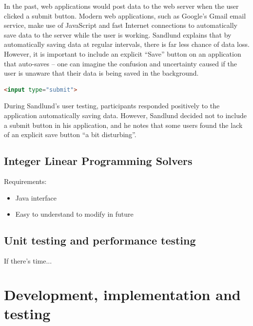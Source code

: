 \documentclass[draft]{scrartcl}
\begin{document}

In the past, web applications would \gls{post} data to the web server when the
user clicked a submit button. Modern web applications, such as Google's Gmail
email service, make use of JavaScript and fast Internet connections to
automatically save data to the server while the user is working. Sandlund
\cite{sandlund2009websoftware} explains that by automatically saving data at
regular intervals, there is far less chance of data loss. However, it is
important to include an explicit ``Save'' button on an application that
auto-saves -- one can imagine the confusion and uncertainty caused if the user
is unaware that their data is being saved in the background.

\begin{lstlisting}[language=HTML]
<input type="submit">
\end{lstlisting}

During Sandlund's user testing, participants responded positively to the
application automatically saving data. However, Sandlund decided not to
include a submit button in his application, and he notes that some users found
the lack of an explicit save button ``a bit disturbing''.

\subsection{Integer Linear Programming Solvers}


Requirements:

\begin{itemize}
  \item Java interface
  \item Easy to understand to modify in future
\end{itemize}

\subsection{Unit testing and performance testing}

If there's time...

\section{Development, implementation and testing}
\label{sec:implementation}
\end{document}

